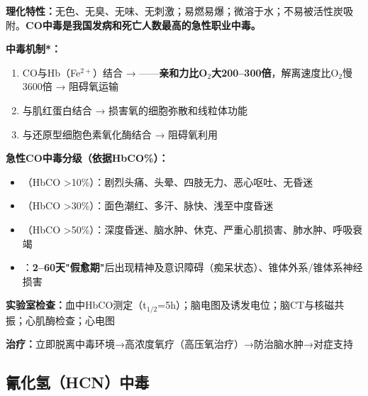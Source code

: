 \begin{keybox}
\textbf{理化特性：}无色、无臭、无味、无刺激；易燃易爆；微溶于水；不易被活性炭吸附。\textbf{CO中毒是我国发病和死亡人数最高的急性职业中毒。}

\textbf{中毒机制*：}
\begin{enumerate}[leftmargin=*]
    \item CO与Hb（Fe$^{2+}$）结合 → ——\textbf{亲和力比O$_2$大200--300倍}，解离速度比O$_2$慢3600倍 → 阻碍氧运输
    \item 与肌红蛋白结合 → 损害氧的细胞弥散和线粒体功能
    \item 与还原型细胞色素氧化酶结合 → 阻碍氧利用
\end{enumerate}

\textbf{急性CO中毒分级（依据HbCO\%）：}
\begin{itemize}[leftmargin=*]
    \item {}（HbCO >10\%）：剧烈头痛、头晕、四肢无力、恶心呕吐、无昏迷
    \item {}（HbCO >30\%）：面色潮红、多汗、脉快、浅至中度昏迷
    \item {}（HbCO >50\%）：深度昏迷、脑水肿、休克、严重心肌损害、肺水肿、呼吸衰竭
    \item {}：\textbf{2--60天"假愈期"}后出现精神及意识障碍（痴呆状态）、锥体外系/锥体系神经损害
\end{itemize}

\textbf{实验室检查：}血中HbCO测定（t$_{1/2}$=5h）；脑电图及诱发电位；脑CT与核磁共振；心肌酶检查；心电图

\textbf{治疗：}立即脱离中毒环境→高浓度氧疗（高压氧治疗）→防治脑水肿→对症支持
\end{keybox}

\subsection{氰化氢（HCN）中毒}

